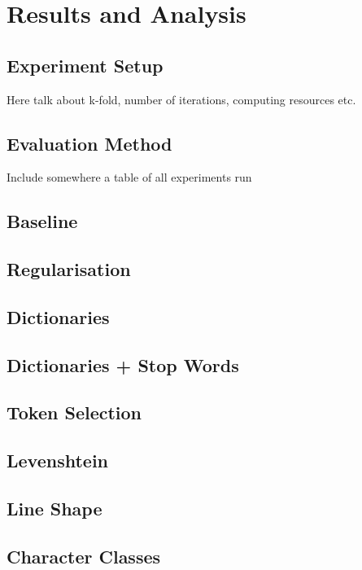 
\chapter{Results and Analysis} %

\label{Chapter5} %



\section{Experiment Setup}
Here talk about k-fold, number of iterations, computing resources etc.
\section{Evaluation Method}
Include somewhere a table of all experiments run
\section{Baseline}
\section{Regularisation}
\section{Dictionaries}
\section{Dictionaries + Stop Words}
\section{Token Selection}
\section{Levenshtein}
\section{Line Shape}
\section{Character Classes}
